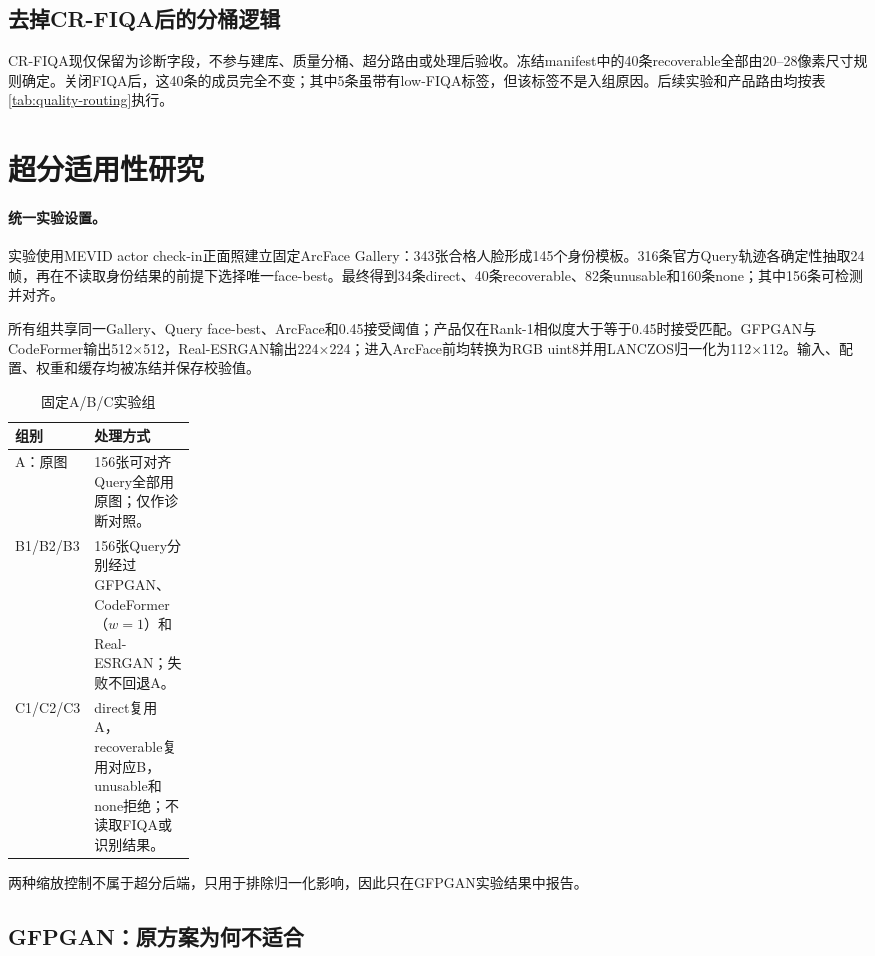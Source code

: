 \documentclass[UTF8,a4paper,10pt]{ctexart}
\begin{document}
\subsection{去掉CR-FIQA后的分桶逻辑}

CR-FIQA现仅保留为诊断字段，不参与建库、质量分桶、超分路由或处理后验收。冻结manifest中的40条recoverable全部由20--28像素尺寸规则确定。关闭FIQA后，这40条的成员完全不变；其中5条虽带有low-FIQA标签，但该标签不是入组原因。后续实验和产品路由均按表\ref{tab:quality-routing}执行。

\section{超分适用性研究}

\paragraph{统一实验设置。}
实验使用MEVID actor check-in正面照建立固定ArcFace Gallery\cite{arcface}：343张合格人脸形成145个身份模板。316条官方Query轨迹各确定性抽取24帧，再在不读取身份结果的前提下选择唯一face-best。最终得到34条direct、40条recoverable、82条unusable和160条none；其中156条可检测并对齐。

所有组共享同一Gallery、Query face-best、ArcFace和0.45接受阈值；产品仅在Rank-1相似度大于等于0.45时接受匹配。GFPGAN与CodeFormer输出512$\times$512，Real-ESRGAN输出224$\times$224；进入ArcFace前均转换为RGB uint8并用LANCZOS归一化为112$\times$112。输入、配置、权重和缓存均被冻结并保存校验值。

\begin{table}[!htbp]
\centering
\caption{固定A/B/C实验组}
\label{tab:protocol}
\small
\begin{tabularx}{\linewidth}{
  >{\centering\arraybackslash}p{0.21\linewidth}
  >{\raggedright\arraybackslash}X}
\toprule
组别 & 处理方式\\
\midrule
A：原图 &
156张可对齐Query全部用原图；仅作诊断对照。\\
B1/B2/B3 &
156张Query分别经过GFPGAN、CodeFormer（$w=1$）和Real-ESRGAN；失败不回退A。\\
C1/C2/C3 &
direct复用A，recoverable复用对应B，unusable和none拒绝；不读取FIQA或识别结果。\\
\bottomrule
\end{tabularx}
\end{table}

两种缩放控制不属于超分后端，只用于排除归一化影响，因此只在GFPGAN实验结果中报告。

\subsection{GFPGAN：原方案为何不适合}
\end{document}
